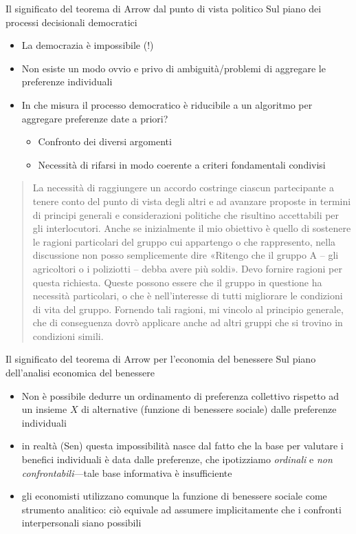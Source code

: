 \documentclass[aspectratio=64,11pt]{beamer}
\begin{document}
\begin{frame}{Il significato del teorema di Arrow dal punto di vista politico}
Sul piano dei processi decisionali democratici
\begin{itemize}
\item La democrazia è impossibile (!)
\item Non esiste un modo ovvio e privo di ambiguità/problemi di aggregare le
preferenze individuali
\item In che misura il processo democratico è riducibile a un algoritmo per
aggregare preferenze date a priori?
\begin{itemize}
\item Confronto dei diversi argomenti
\item Necessità di rifarsi in modo coerente a criteri fondamentali condivisi
\end{itemize}
\end{itemize}

\begin{quotation}
\linespread{.9}\noindent\footnotesize La necessità di raggiungere un accordo costringe ciascun partecipante a tenere conto del punto di vista degli altri e ad avanzare proposte in termini di principi generali e considerazioni politiche che risultino accettabili per gli interlocutori. Anche se inizialmente il mio obiettivo è quello di sostenere le ragioni particolari del gruppo cui appartengo o che rappresento, nella discussione non posso semplicemente dire «Ritengo che il gruppo A -- gli agricoltori o i poliziotti -- debba avere più soldi». Devo fornire ragioni per questa richiesta. Queste possono essere che il gruppo in questione ha necessità particolari, o che è nell'interesse di tutti migliorare le condizioni di vita del gruppo. Fornendo tali ragioni, mi vincolo al principio generale, che di conseguenza dovrò applicare anche ad altri gruppi che si trovino in condizioni simili.
\end{quotation}
\end{frame}

\begin{frame}{Il significato del teorema di Arrow per l'economia del benessere}
Sul piano dell'analisi economica del benessere
\begin{itemize}
\item Non è possibile dedurre un ordinamento di preferenza collettivo rispetto ad
un insieme $X$ di alternative (funzione di benessere sociale) dalle
preferenze individuali
\item in realtà (Sen) questa impossibilità nasce dal fatto che la base per
valutare i benefici individuali è data dalle preferenze, che ipotizziamo
\emph{ordinali} e \emph{non confrontabili}---tale base informativa è insufficiente
\item gli economisti utilizzano comunque la funzione di benessere sociale come
strumento analitico: ciò equivale ad assumere implicitamente che i confronti
interpersonali siano possibili
\end{itemize}
\end{frame}
\end{document}
